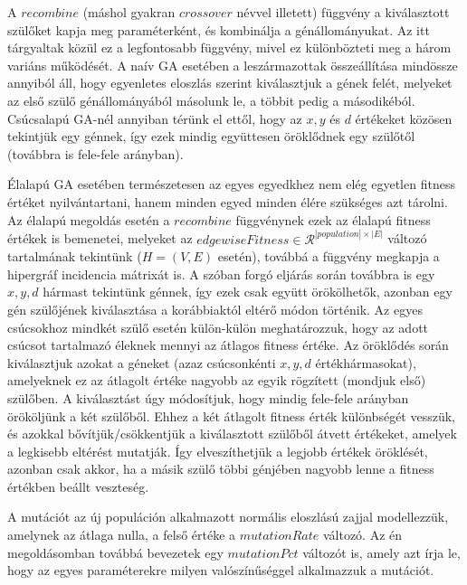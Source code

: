A $recombine$ (máshol gyakran $crossover$ névvel illetett) függvény a kiválasztott szülőket kapja meg paraméterként, és kombinálja a génállományukat. Az itt tárgyaltak közül ez a legfontosabb függvény, mivel ez különbözteti meg a három variáns működését. A naív GA esetében a leszármazottak összeállítása mindössze annyiból áll, hogy egyenletes eloszlás szerint kiválasztjuk a gének felét, melyeket az első szülő génállományából másolunk le, a többit pedig a másodikéból. Csúcsalapú GA-nél annyiban térünk el ettől, hogy az $x,y$ és $d$ értékeket közösen tekintjük egy génnek, így ezek mindig együttesen öröklődnek egy szülőtől (továbbra is fele-fele arányban).


Élalapú GA esetében természetesen az egyes egyedkhez nem elég egyetlen fitness értéket nyilvántartani, hanem minden egyed minden élére szükséges azt tárolni. Az élalapú megoldás esetén a $recombine$ függvénynek ezek az élalapú fitness értékek is bemenetei, melyeket az $edgewiseFitness \in \mathcal{R}^{|population| \times |E|}$ változó tartalmának tekintünk ($H=(V,E)$ esetén), továbbá a függvény megkapja a hipergráf incidencia mátrixát is. A szóban forgó eljárás során továbbra is egy $x,y,d$ hármast tekintünk génnek, így ezek csak együtt örökölhetők, azonban egy gén szülőjének kiválasztása a korábbiaktól eltérő módon történik. Az egyes csúcsokhoz mindkét szülő esetén külön-külön meghatározzuk, hogy az adott csúcsot tartalmazó éleknek mennyi az átlagos fitness értéke. Az öröklődés során kiválasztjuk azokat a géneket (azaz csúcsonkénti $x,y,d$ értékhármasokat), amelyeknek ez az átlagolt értéke nagyobb az egyik rögzített (mondjuk első) szülőben. A kiválasztást úgy módosítjuk, hogy mindig fele-fele arányban örököljünk a két szülőből. Ehhez a két átlagolt fitness érték különbségét vesszük, és azokkal bővítjük/csökkentjük a kiválasztott szülőből átvett értékeket, amelyek a legkisebb eltérést mutatják. Így elveszíthetjük a legjobb értékek öröklését, azonban csak akkor, ha a másik szülő többi génjében nagyobb lenne a fitness értékben beállt veszteség.


A mutációt az új populáción alkalmazott normális eloszlású zajjal modellezzük, amelynek az átlaga nulla, a felső értéke a $mutationRate$ változó. Az én megoldásomban továbbá bevezetek egy $mutationPct$ változót is, amely azt írja le, hogy az egyes paraméterekre milyen valószínűséggel alkalmazzuk a mutációt.



